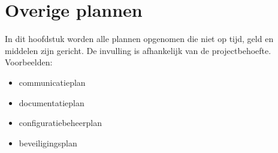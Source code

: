 \section{Overige plannen}
\label{overige}

In dit hoofdstuk worden alle plannen opgenomen die niet op tijd, geld en middelen zijn gericht.
De invulling is afhankelijk van de projectbehoefte.
Voorbeelden:
\begin{itemize}
  \item communicatieplan
  \item documentatieplan
  \item configuratiebeheerplan
  \item beveiligingsplan
\end{itemize}

